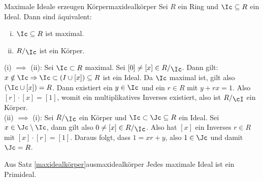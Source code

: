 \begin{satz}{Maximale Ideale erzeugen Körper}{maxidealkörper}
Sei $R$ ein Ring und $\Ic \sub R$ ein Ideal. Dann sind äquivalent:
\begin{enumerate}[(i)]
\item $\Ic \sub R$ ist maximal.
\item $\quotient{R}{\Ic}$ ist ein Körper.
\end{enumerate}
\end{satz}
\begin{beweis}
(i) $\implies$ (ii): Sei $\Ic \subset R$ maximal. Sei $[0] \neq [x] \in \quotient{R}{\Ic}$. Dann gilt: $x \notin \Ic \implies \Ic \subset (I \cup [x]) \sub R$ ist ein Ideal. Da $\Ic$ maximal ist, gilt also $(\Ic \cup [x]) = R$. Dann existiert ein $y \in \Ic$ und ein $r \in R$ mit $y +rx=1$. Also $[r] \cdot [x] = [1]$, womit ein multiplikatives Inverses existiert, also ist $\quotient{R}{\cI}$ ein Körper.\\
(ii) $\implies$ (i): Sei $\quotient{R}{\Ic}$ ein Körper und $\Ic \subset \Jc \sub R$ ein Ideal. Sei $x \in \Jc \setminus \Ic$, dann gilt also $0 \neq [x] \in \quotient{R}{\Ic}$. Also hat $[x]$ ein Inverses $r \in R$ mit $[x] \cdot [r] = [1]$. Daraus folgt, dass $1 = xr +y$, also $1 \in \Jc$ und damit $\Jc = R$.
\end{beweis}
\begin{korollar}{Aus Satz \ref{maxidealkörper}}{ausmaxidealkörper}
Jedes maximale Ideal ist ein Primideal.
\end{korollar}
